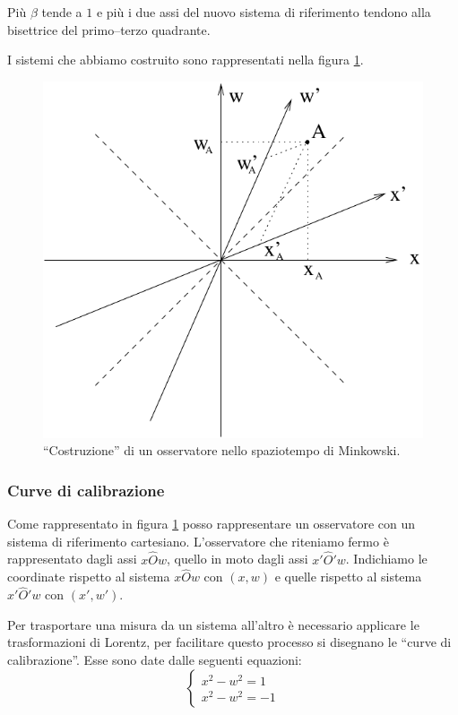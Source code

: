 Più $\beta$ tende a $1$ e più i due assi del nuovo sistema di riferimento tendono alla bisettrice del primo--terzo quadrante.

I sistemi che abbiamo costruito sono rappresentati nella figura \ref{Mink2}.
\begin{figure}
   \centering
   \includegraphics[scale=1]{immagini/minkowski/Mink2}
   \caption{\label{Mink2} ``Costruzione'' di un osservatore nello spaziotempo di Minkowski.}
\end{figure}


\subsubsection{Curve di calibrazione}

Come rappresentato in figura \ref{Mink2} posso rappresentare un osservatore con un sistema di riferimento cartesiano.
L'osservatore che riteniamo fermo è rappresentato dagli assi $x \hat O w$, quello in moto dagli assi $x' \hat O' w$. Indichiamo 
le coordinate rispetto al sistema $x \hat O w$ con $(x,w)$ e quelle rispetto al sistema $x' \hat O' w$ con $(x',w')$.

Per trasportare una misura da un sistema all'altro è necessario applicare le trasformazioni di Lorentz, per facilitare questo
processo si disegnano le ``curve di calibrazione''.  Esse sono date dalle seguenti equazioni:
\begin{equation}
\left\{\begin{array}{l}
x^2 - w^2 =  1\\
x^2 - w^2 = -1\end{array}\right. 
\end{equation}

